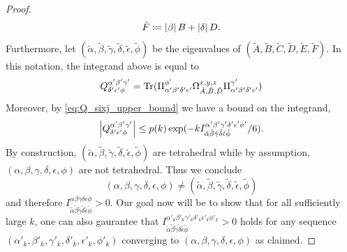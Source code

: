 \documentclass[notitlepage, 10pt]{article}
\begin{document}
\begin{proof}
\begin{equation}
\begin{alignedat}{3}
            &&\tilde F \coloneqq \left|\beta\right|B + \left|\delta\right|D.
        \end{alignedat}
    \end{equation} 
    Furthermore, let $(\tilde \alpha, \tilde \beta, \tilde \gamma, \tilde \delta, \tilde \epsilon, \tilde \phi)$ be the eigenvalues of $(\tilde A, \tilde B, \tilde C, \tilde D, \tilde E, \tilde F)$.
    In this notation, the integrand above is equal to
    \begin{equation}
        Q^{\alpha'\beta'\gamma'}_{\delta'\epsilon'\phi} = \operatorname{Tr}(\Pi^{\phi'}_{\alpha'\beta'\delta'\epsilon'}\Omega_{\tilde A,\tilde B,\tilde D}^{x,y,z}\Pi^{\gamma'}_{\alpha'\beta'\delta'\epsilon'})
    \end{equation}
    Moreover, by \cref{eq:Q_sixj_upper_bound} we have a bound on the integrand,
    \begin{equation}
        \left|Q^{\alpha'\beta'\gamma'}_{\delta'\epsilon'\phi}\right| \leq p(k) \exp(-k I^{\alpha'\beta'\gamma'\delta'\epsilon'\phi'}_{\tilde \alpha \tilde \beta\tilde \gamma\tilde \delta\tilde \epsilon\tilde \phi}/6).
    \end{equation}
    By construction, $(\tilde \alpha, \tilde \beta, \tilde \gamma, \tilde \delta, \tilde \epsilon, \tilde \phi)$ are tetrahedral while by assumption, $(\alpha, \beta, \gamma, \delta, \epsilon, \phi)$ are not tetrahedral.
    Thus we conclude
    \begin{equation}
        (\alpha, \beta, \gamma, \delta, \epsilon, \phi) \neq (\tilde \alpha, \tilde \beta, \tilde \gamma, \tilde \delta, \tilde \epsilon, \tilde \phi)
    \end{equation}
    and therefore $I_{\tilde \alpha\tilde \beta\tilde \gamma\tilde \delta\tilde \epsilon\tilde \phi}^{\alpha\beta\gamma\delta\epsilon\phi} > 0$.
    Our goal now will be to show that for all sufficiently large $k$, one can also gaurantee that $I_{\tilde \alpha\tilde \beta\tilde \gamma\tilde \delta\tilde \epsilon\tilde \phi}^{\alpha'_k\beta'_k\gamma'_k\delta'_k\epsilon'_k\phi'_k} > 0$ holds for any sequence $(\alpha'_k, \beta'_k, \gamma'_k, \delta'_k, \epsilon'_k, \phi'_k)$ converging to $(\alpha,\beta,\gamma,\delta,\epsilon,\phi)$ as claimed. 

\end{proof}
\end{document}
